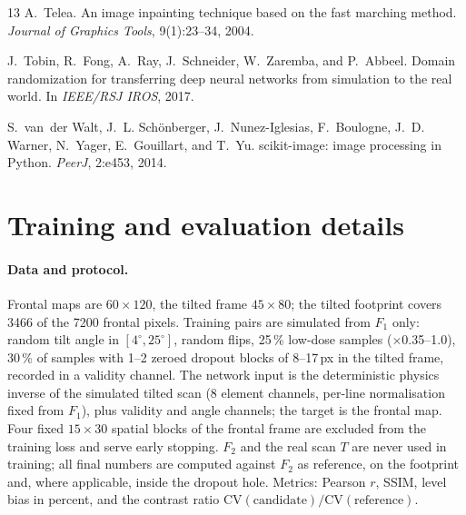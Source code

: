 \documentclass{article}
\newcommand{\Fone}{$F_1$}
\newcommand{\Ftwo}{$F_2$}
\newcommand{\Treal}{$T$}
\begin{document}
\begin{thebibliography}{13}
A.~Telea.
\newblock An image inpainting technique based on the fast marching method.
\newblock \emph{Journal of Graphics Tools}, 9(1):23--34, 2004.

J.~Tobin, R.~Fong, A.~Ray, J.~Schneider, W.~Zaremba, and P.~Abbeel.
\newblock Domain randomization for transferring deep neural networks from simulation to the real world.
\newblock In \emph{IEEE/RSJ IROS}, 2017.

S.~van~der Walt, J.~L. Sch{\"o}nberger, J.~Nunez-Iglesias, F.~Boulogne, J.~D. Warner, N.~Yager, E.~Gouillart, and T.~Yu.
\newblock scikit-image: image processing in Python.
\newblock \emph{PeerJ}, 2:e453, 2014.

\end{thebibliography}

\appendix

\section{Training and evaluation details}
\label{app:training}

\paragraph{Data and protocol.} Frontal maps are $60\times120$, the tilted frame $45\times80$; the tilted footprint covers 3466 of the 7200 frontal pixels. Training pairs are simulated from \Fone{} only: random tilt angle in $[4^\circ, 25^\circ]$, random flips, 25\,\% low-dose samples ($\times$0.35--1.0), 30\,\% of samples with 1--2 zeroed dropout blocks of 8--17\,px in the tilted frame, recorded in a validity channel. The network input is the deterministic physics inverse of the simulated tilted scan (8 element channels, per-line normalisation fixed from \Fone{}), plus validity and angle channels; the target is the frontal map. Four fixed $15\times30$ spatial blocks of the frontal frame are excluded from the training loss and serve early stopping. \Ftwo{} and the real scan \Treal{} are never used in training; all final numbers are computed against \Ftwo{} as reference, on the footprint and, where applicable, inside the dropout hole. Metrics: Pearson $r$, SSIM, level bias in percent, and the contrast ratio $\mathrm{CV(candidate)}/\mathrm{CV(reference)}$.
\end{document}
